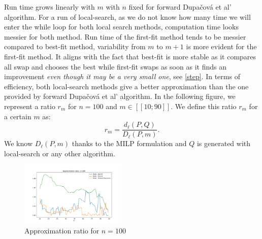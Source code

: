 \documentclass{amsart}
\begin{document}
Run time grows linearly with $m$ with $n$ fixed for forward Dupačová et al' algorithm. For a run of local-search, as we do not know how many time we will enter the while loop for both local search methods, computation time looks messier for both method. Run time of the first-fit method tends to be messier compared to best-fit method, variability from $m$ to $m+1$ is more evident for the first-fit method. It aligns with the fact that best-fit is more stable as it compares all swap and chooses the best while first-fit swaps as soon as it finds an improvement \emph{even though it may be a very small one}, see \ref{step}. In terms of efficiency, both local-search methods give a better approximation than the one provided by forward Dupačová et al' algorithm. In the following figure, we represent a ratio $r_m$ for $n=100$ and $m\in [\![10;90]\!]$. We define this ratio $r_m$ for a certain $m$ as: 
$$
r_m = \frac{d_\ell\left(P,Q\right)}{D_\ell\left(P,m\right)}.
$$
We know $D_\ell\left(P,m\right)$ thanks to the MILP formulation and $Q$ is generated with local-search or any other algorithm.

\begin{figure}[ht]
    \centering
    \includegraphics[width=0.45\textwidth]{plots/ratio with milp.pdf}
    \caption{Approximation ratio for $n=100$}
\end{figure}
    
\end{document}
